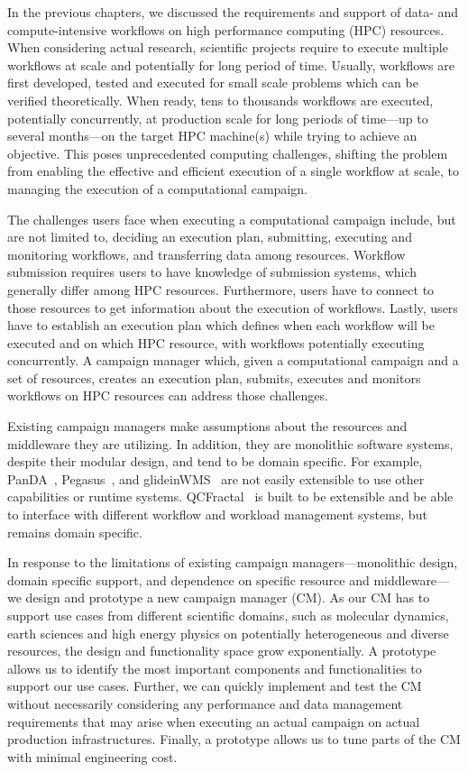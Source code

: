 
In the previous chapters, we discussed the requirements and support of
data- and compute-intensive workflows on high performance computing (HPC)
resources. When considering actual research, scientific projects require to
execute multiple workflows at scale and potentially for long period of time.
Usually, workflows are first developed, tested and executed for small scale
problems which can be verified theoretically. When ready, tens to thousands 
workflows are executed, potentially concurrently, at production scale for long 
periods of time---up to several months---on the target HPC machine(s) while 
trying to achieve an objective. This poses unprecedented computing challenges, 
shifting the problem from enabling the effective and efficient execution of a 
single workflow at scale, to managing the execution of a computational campaign.

The challenges users face when executing a computational campaign include, but
are not limited to, deciding an execution plan, submitting, executing and
monitoring workflows, and transferring data among resources. Workflow submission
requires users to have knowledge of submission systems, which generally differ
among HPC resources. Furthermore, users have to connect to those resources to
get information about the execution of workflows. Lastly, users have to
establish an execution plan which defines when each workflow will be executed
and on which HPC resource, with workflows potentially executing concurrently. A
campaign manager which, given a computational campaign and a set of resources,
creates an execution plan, submits, executes and monitors workflows on HPC
resources can address those challenges.

Existing campaign managers make assumptions about the resources and middleware
they are utilizing. In addition, they are monolithic software systems, despite
their modular design, and tend to be domain specific. For example,
PanDA~\cite{maeno2008panda}, Pegasus~\cite{deelman2015pegasus}, and
glideinWMS~\cite{sfiligoi2008glidein} are not easily extensible to use other
capabilities or runtime systems. QCFractal~\cite{qcfractal} is built to be
extensible and be able to interface with different workflow and workload
management systems, but remains domain specific.

In response to the limitations of existing campaign managers---monolithic
design, domain specific support, and dependence on specific resource and
middleware---we design and prototype a new campaign manager (CM). As our
CM has to support use cases from different scientific domains,
such as molecular dynamics, earth sciences and high energy physics on
potentially heterogeneous and diverse resources, the design and functionality
space grow exponentially. A prototype allows us to identify the most important
components and functionalities to support our use cases. Further, we can quickly
implement and test the CM without necessarily considering any
performance and data management requirements that may arise when executing an
actual campaign on actual production infrastructures. Finally, a prototype
allows us to tune parts of the CM with minimal engineering cost.

